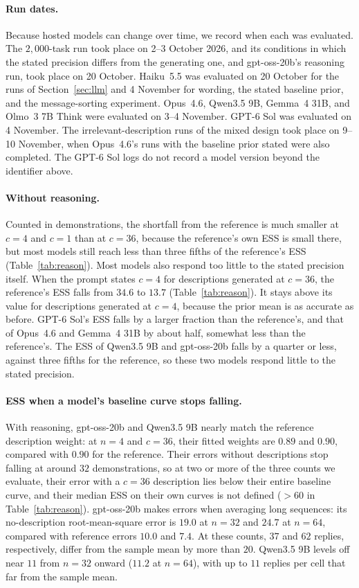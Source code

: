 \documentclass{article}
\theoremstyle{definition}
\begin{document}
\paragraph{Run dates.}
Because hosted models can change over time, we record when each was evaluated. The $2{,}000$-task run took place on 2--3 October 2026, and its conditions in which the stated precision differs from the generating one, and gpt-oss-20b's reasoning run, took place on 20 October. Haiku~5.5 was evaluated on 20 October for the runs of Section~\ref{sec:llm} and 4 November for wording, the stated baseline prior, and the message-sorting experiment. Opus~4.6, Qwen3.5 9B, Gemma~4 31B, and Olmo~3 7B Think were evaluated on 3--4 November. GPT-6 Sol was evaluated on 4 November. The irrelevant-description runs of the mixed design took place on 9--10 November, when Opus~4.6's runs with the baseline prior stated were also completed. The GPT-6 Sol logs do not record a model version beyond the identifier above.

\paragraph{Without reasoning.}
Counted in demonstrations, the shortfall from the reference is much smaller at $c=4$ and $c=1$ than at $c=36$, because the reference's own ESS is small there, but most models still reach less than three fifths of the reference's ESS (Table~\ref{tab:reason}). Most models also respond too little to the stated precision itself. When the prompt states $c=4$ for descriptions generated at $c=36$, the reference's ESS falls from $34.6$ to $13.7$ (Table~\ref{tab:reason}). It stays above its value for descriptions generated at $c=4$, because the prior mean is as accurate as before. GPT-6 Sol's ESS falls by a larger fraction than the reference's, and that of Opus~4.6 and Gemma~4 31B by about half, somewhat less than the reference's. The ESS of Qwen3.5 9B and gpt-oss-20b falls by a quarter or less, against three fifths for the reference, so these two models respond little to the stated precision.

\paragraph{ESS when a model's baseline curve stops falling.}
With reasoning, gpt-oss-20b and Qwen3.5 9B nearly match the reference description weight: at $n=4$ and $c=36$, their fitted weights are $0.89$ and $0.90$, compared with $0.90$ for the reference. Their errors without descriptions stop falling at around $32$ demonstrations, so at two or more of the three counts we evaluate, their error with a $c=36$ description lies below their entire baseline curve, and their median ESS on their own curves is not defined ($>60$ in Table~\ref{tab:reason}). gpt-oss-20b makes errors when averaging long sequences: its no-description root-mean-square error is $19.0$ at $n=32$ and $24.7$ at $n=64$, compared with reference errors $10.0$ and $7.4$. At these counts, $37$ and $62$ replies, respectively, differ from the sample mean by more than $20$. Qwen3.5 9B levels off near $11$ from $n=32$ onward ($11.2$ at $n=64$), with up to $11$ replies per cell that far from the sample mean.
\end{document}
